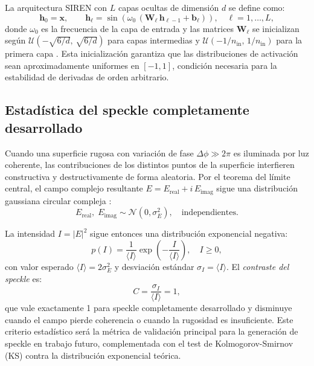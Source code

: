 La arquitectura SIREN con $L$ capas ocultas de dimensión $d$ se define como:
%
\begin{equation}
  \mathbf{h}_0 = \mathbf{x}, \qquad
  \mathbf{h}_\ell = \sin\!\left(\omega_0\,(\mathbf{W}_\ell\,\mathbf{h}_{\ell-1} + \mathbf{b}_\ell)\right),
  \quad \ell = 1, \ldots, L,
  \label{eq:siren}
\end{equation}
%
donde $\omega_0$ es la frecuencia de la capa de entrada y las matrices $\mathbf{W}_\ell$
se inicializan según $\mathcal{U}(-\sqrt{6/d},\,\sqrt{6/d})$ para capas intermedias
y $\mathcal{U}(-1/n_{\mathrm{in}},\,1/n_{\mathrm{in}})$ para la primera capa
\cite{Sitzmann2020_SIREN}.
Esta inicialización garantiza que las distribuciones de activación sean aproximadamente
uniformes en $[-1, 1]$, condición necesaria para la estabilidad de derivadas de orden
arbitrario.

\subsection{Estadística del speckle completamente desarrollado}
\label{subsec:speckle}

Cuando una superficie rugosa con variación de fase $\Delta\phi \gg 2\pi$ es iluminada
por luz coherente, las contribuciones de los distintos puntos de la superficie interfieren
constructiva y destructivamente de forma aleatoria.
Por el teorema del límite central, el campo complejo resultante
$E = E_{\mathrm{real}} + i\,E_{\mathrm{imag}}$ sigue una distribución gaussiana circular
compleja \cite{Goodman2007_Speckle}:
%
\begin{equation}
  E_{\mathrm{real}},\; E_{\mathrm{imag}} \sim \mathcal{N}(0, \sigma_E^2),
  \quad \text{independientes.}
  \label{eq:campo_gaussiano}
\end{equation}

La intensidad $I = |E|^2$ sigue entonces una distribución exponencial negativa:
%
\begin{equation}
  p(I) = \frac{1}{\langle I \rangle}\exp\!\left(-\frac{I}{\langle I \rangle}\right),
  \quad I \geq 0,
  \label{eq:pdf_intensidad}
\end{equation}
%
con valor esperado $\langle I \rangle = 2\sigma_E^2$ y desviación estándar
$\sigma_I = \langle I \rangle$.
El \textit{contraste del speckle} es:
%
\begin{equation}
  C = \frac{\sigma_I}{\langle I \rangle} = 1,
  \label{eq:contraste}
\end{equation}
%
que vale exactamente 1 para speckle completamente desarrollado y disminuye
cuando el campo pierde coherencia o cuando la rugosidad es insuficiente.
Este criterio estadístico será la métrica de validación principal para la
generación de speckle en trabajo futuro, complementada con el test de
Kolmogorov-Smirnov (KS) contra la distribución exponencial teórica.
